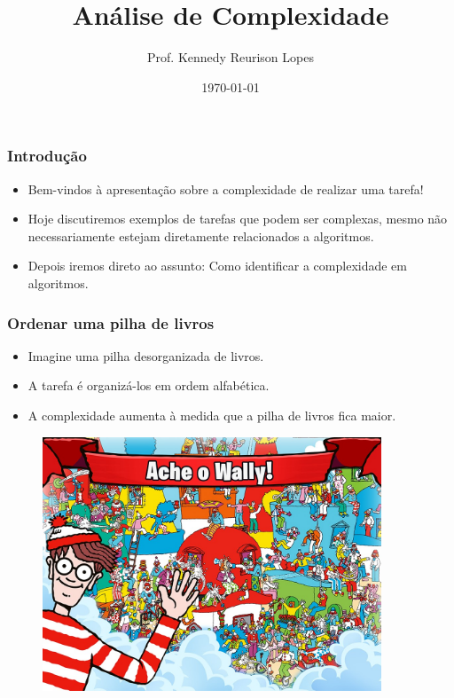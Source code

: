 \documentclass[12pt]{beamer}
\title{Análise de Complexidade}
\author{Prof. Kennedy Reurison Lopes}
\date{\today}
\begin{document}
\frame{\titlepage}

\begin{frame}
    \frametitle{Introdução}

    \begin{itemize}
        \item Bem-vindos à apresentação sobre a complexidade de realizar uma tarefa!
        \item Hoje discutiremos exemplos de tarefas que podem ser complexas, mesmo não necessariamente estejam diretamente relacionados a algoritmos.
        \item Depois iremos direto ao assunto: Como identificar a complexidade em algoritmos.
    \end{itemize}
\end{frame}

\begin{frame}
    \frametitle{Ordenar uma pilha de livros}
    \begin{itemize}
        \item Imagine uma pilha desorganizada de livros.
        \item A tarefa é organizá-los em ordem alfabética.
        \item A complexidade aumenta à medida que a pilha de livros fica maior.
    \end{itemize}
\end{frame}

\begin{frame}
    \begin{figure}[htb]
        \centering
        \includegraphics[width=0.9\textwidth]{wally.jpg}
        \label{fig:wally2}
    \end{figure}
\end{frame}
\end{document}
